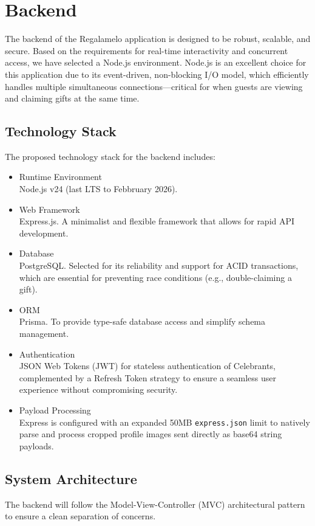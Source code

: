 \chapter{Backend}
The backend of the Regalamelo application is designed to be robust, scalable, and secure. Based on the requirements for real-time interactivity and concurrent access, we have selected a Node.js environment. Node.js is an excellent choice for this application due to its event-driven, non-blocking I/O model, which efficiently handles multiple simultaneous connections—critical for when guests are viewing and claiming gifts at the same time.

\section{Technology Stack}
The proposed technology stack for the backend includes:
\begin{itemize}
    \item Runtime Environment \\
        Node.js v24 (last LTS to Febbruary 2026).
    \item Web Framework \\
        Express.js. A minimalist and flexible framework that allows for rapid API development.
    \item Database \\
        PostgreSQL. Selected for its reliability and support for ACID transactions, which are essential for preventing race conditions (e.g., double-claiming a gift).
    \item ORM \\
        Prisma. To provide type-safe database access and simplify schema management.
    \item Authentication \\
        JSON Web Tokens (JWT) for stateless authentication of Celebrants, complemented by a Refresh Token strategy to ensure a seamless user experience without compromising security.
    \item Payload Processing \\
        Express is configured with an expanded 50MB \texttt{express.json} limit to natively parse and process cropped profile images sent directly as base64 string payloads.
\end{itemize}

\section{System Architecture}
The backend will follow the Model-View-Controller (MVC) architectural pattern to ensure a clean separation of concerns.

